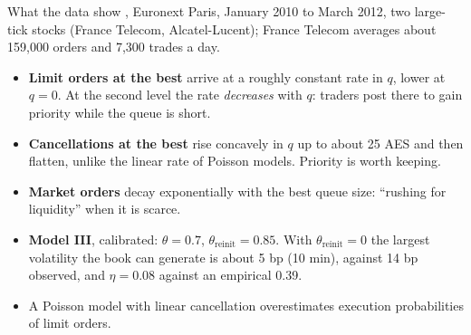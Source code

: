 \documentclass[aspectratio=169,10pt]{beamer}
\begin{document}
\begin{frame}{What the data show}
  \small
  \citet{huang2015simulating}, Euronext Paris, January 2010 to March 2012, two large-tick stocks (France Telecom, Alcatel-Lucent); France Telecom averages about 159,000 orders and 7,300 trades a day.
  \begin{itemize}
    \item \textbf{Limit orders at the best} arrive at a roughly constant rate in $q$, lower at $q = 0$. At the second level the rate \emph{decreases} with $q$: traders post there to gain priority while the queue is short.
    \item \textbf{Cancellations at the best} rise concavely in $q$ up to about 25 AES and then flatten, unlike the linear rate of Poisson models. Priority is worth keeping.
    \item \textbf{Market orders} decay exponentially with the best queue size: ``rushing for liquidity'' when it is scarce.
    \item \textbf{Model III}, calibrated: $\theta = 0.7$, $\theta_{\mathrm{reinit}} = 0.85$. With $\theta_{\mathrm{reinit}} = 0$ the largest volatility the book can generate is about 5 bp (10 min), against 14 bp observed, and $\eta = 0.08$ against an empirical 0.39.
    \item A Poisson model with linear cancellation overestimates execution probabilities of limit orders.
  \end{itemize}
\end{frame}
\end{document}
